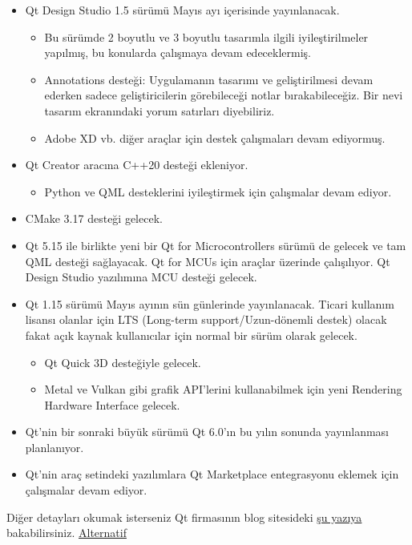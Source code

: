 \documentclass[11pt]{article}
\begin{document}
\begin{itemize}
\item Qt Design Studio 1.5 sürümü Mayıs ayı içerisinde yayınlanacak.
\begin{itemize}
\item Bu sürümde 2 boyutlu ve 3 boyutlu tasarımla ilgili iyileştirilmeler
yapılmış, bu konularda çalışmaya devam edeceklermiş.
\item Annotations desteği: Uygulamanın tasarımı ve geliştirilmesi devam ederken
sadece geliştiricilerin görebileceği notlar bırakabileceğiz. Bir nevi
tasarım ekranındaki yorum satırları diyebiliriz.
\item Adobe XD vb. diğer araçlar için destek çalışmaları devam ediyormuş.
\end{itemize}
\item Qt Creator aracına C++20 desteği ekleniyor.
\begin{itemize}
\item Python ve QML desteklerini iyileştirmek için çalışmalar devam ediyor.
\end{itemize}
\item CMake 3.17 desteği gelecek.
\item Qt 5.15 ile birlikte yeni bir Qt for Microcontrollers sürümü de gelecek ve
tam QML desteği sağlayacak. Qt for MCUs için araçlar üzerinde çalışılıyor.
Qt Design Studio yazılımına MCU desteği gelecek.
\item Qt 1.15 sürümü Mayıs ayının sün günlerinde yayınlanacak. Ticari kullanım
lisansı olanlar için LTS (Long-term support/Uzun-dönemli destek) olacak
fakat açık kaynak kullanıcılar için normal bir sürüm olarak gelecek.
\begin{itemize}
\item Qt Quick 3D desteğiyle gelecek.
\item Metal ve Vulkan gibi grafik API'lerini kullanabilmek için yeni Rendering
Hardware Interface gelecek.
\end{itemize}
\item Qt'nin bir sonraki büyük sürümü Qt 6.0'ın bu yılın sonunda yayınlanması
planlanıyor.
\item Qt'nin araç setindeki yazılımlara Qt Marketplace entegrasyonu eklemek için
çalışmalar devam ediyor.
\end{itemize}

Diğer detayları okumak isterseniz Qt firmasının blog sitesideki \href{https://www.qt.io/blog/qt-roadmap-for-2020}{şu yazıya}
bakabilirsiniz. \href{https://www.phoronix.com/scan.php?page=news\_item\&px=Qt-2020-Roadmap}{Alternatif}
\end{document}
